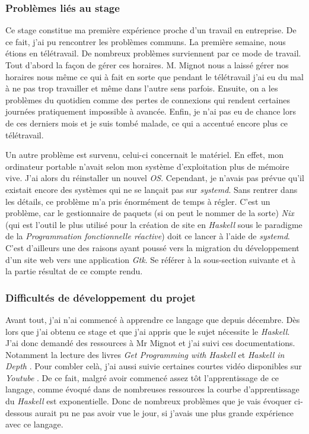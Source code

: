 \subsubsection{Problèmes liés au stage}

Ce stage constitue ma première expérience proche d'un travail en entreprise. De 
ce fait, j'ai pu rencontrer les problèmes communs. La première semaine, nous 
étions en télétravail.
De nombreux problèmes surviennent par ce mode de travail. Tout d'abord la façon 
de gérer ces horaires. M. Mignot nous a laissé gérer nos horaires nous même ce 
qui à fait en sorte que pendant le télétravail j'ai eu du mal à ne pas trop 
travailler et même dans l'autre sens parfois. Ensuite, on a les problèmes du 
quotidien comme des pertes de connexions qui rendent certaines journées
pratiquement impossible à avancée. Enfin, je n'ai pas eu de chance lors de ces 
derniers mois et je suis tombé malade, ce qui a accentué encore plus ce 
télétravail.

\newpage

Un autre problème est survenu, celui-ci concernait le matériel. En effet, mon 
ordinateur portable n'avait selon mon système d'exploitation plus de mémoire 
vive. J'ai alors du réinstaller un nouvel \textit{OS}. Cependant, je n'avais pas
prévue qu'il existait encore des systèmes qui ne se lançait pas sur 
\textit{systemd}. Sans rentrer dans les détails, ce problème m’a pris énormément 
de temps à régler. C'est un problème, car le gestionnaire de paquets (si on peut 
le nommer de la sorte) \textit{Nix} (qui est l'outil le plus utilisé pour la 
création de site en \textit{Haskell} sous le paradigme de la 
\textit{Programmation fonctionnelle réactive}) doit ce lancer à l'aide de 
\textit{systemd}. C'est d'ailleurs une des raisons ayant poussé vers la 
migration du développement d'un site web vers une application \textit{Gtk}. Se 
référer à la sous-section suivante et à la partie résultat de ce compte rendu. 

\subsubsection{Difficultés de développement du projet}

Avant tout, j'ai n'ai commencé à apprendre ce langage que depuis décembre. 
Dès lors que j'ai obtenu ce stage et que j'ai appris que le sujet nécessite le 
\textit{Haskell}. J'ai donc demandé des ressources à Mr Mignot et j'ai suivi 
ces documentations. Notamment la lecture des livres 
\textit{Get Programming with Haskell} et \textit{Haskell in Depth}
\cite{bookWithHaskell, haskellInDepth}. Pour combler celà, j'ai aussi suivie 
certaines courtes vidéo disponibles sur \textit{Youtube}
\cite{playHaksell1, playHaksell2}. De ce fait, malgré avoir commencé assez 
tôt l'apprentissage de ce langage, comme évoqué dans de nombreuses ressources la 
courbe d'apprentissage du \textit{Haskell} est exponentielle. Donc de nombreux 
problèmes que je vais évoquer ci-dessous aurait pu ne pas avoir vue le jour, si 
j'avais une plus grande expérience avec ce langage.

